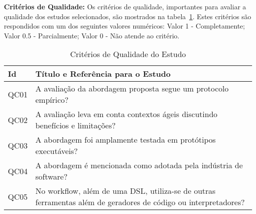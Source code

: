 

\textbf{Critérios de Qualidade:} Os critérios de qualidade, importantes para avaliar a qualidade dos estudos selecionados, são mostrados na tabela~\ref{table:npapers}. Estes critérios são respondidos com um dos seguintes valores numéricos: Valor 1 - Completamente; Valor 0.5 - Parcialmente; Valor 0 - Não atende ao critério. 

\begin{table}[t!]
\small
  \caption{Critérios de Qualidade do Estudo}
  
		\begin{tabular}{ | p{0.5cm} | p{7.2cm} |}%
    \hline

     \textbf{Id}
    & \textbf{Título e Referência para o Estudo}
		\\ \hline

QC01 &  A avaliação da abordagem proposta segue um protocolo empírico? \\ \hline

QC02 &  A avaliação leva em conta contextos ágeis discutindo benefícios e limitações? \\ \hline

QC03 &  A abordagem foi amplamente testada em protótipos executáveis? \\ \hline

QC04 &  A abordagem é mencionada como adotada pela indústria de software?  \\ \hline

QC05 &  No workflow, além de uma DSL, utiliza-se de outras ferramentas além de geradores de código ou interpretadores? \\ \hline





\end{tabular}

\label{table:npapers} 
\end{table}



